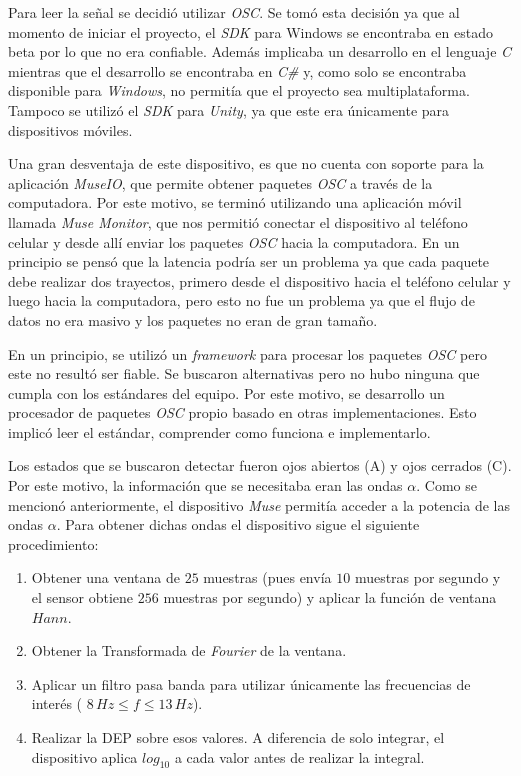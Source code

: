Para leer la señal se decidió utilizar \emph{OSC}. Se tomó esta decisión ya que al momento de iniciar el proyecto, el \emph{SDK} para Windows se encontraba en estado beta por lo que no era confiable. Además implicaba un desarrollo en el lenguaje \emph{C} mientras que el desarrollo se encontraba en \emph{C\#} y, como solo se encontraba disponible para \emph{Windows}, no permitía que el proyecto sea multiplataforma. Tampoco se utilizó el \emph{SDK} para \emph{Unity}, ya que este era únicamente para dispositivos móviles.

Una gran desventaja de este dispositivo, es que no cuenta con soporte para la aplicación \emph{MuseIO}, que permite obtener paquetes \emph{OSC} a través de la computadora. Por este motivo, se terminó utilizando una aplicación móvil llamada \emph{Muse Monitor}, que nos permitió conectar el dispositivo al teléfono celular y desde allí enviar los paquetes \emph{OSC} hacia la computadora. En un principio se pensó que la latencia podría ser un problema ya que cada paquete debe realizar dos trayectos, primero desde el dispositivo hacia el teléfono celular y luego hacia la computadora, pero esto no fue un problema ya que el flujo de datos no era masivo y los paquetes no eran de gran tamaño.

En un principio, se utilizó un \emph{framework} para procesar los paquetes \emph{OSC} pero este no resultó ser fiable. Se buscaron alternativas pero no hubo ninguna que cumpla con los estándares del equipo. Por este motivo, se desarrollo un procesador de paquetes \emph{OSC} propio basado en otras implementaciones. Esto implicó leer el estándar, comprender como funciona e implementarlo.
 
 Los estados que se buscaron detectar fueron ojos abiertos (A) y ojos cerrados (C). Por este motivo, la información que se necesitaba eran las ondas $\alpha$. Como se mencionó anteriormente, el dispositivo \emph{Muse} permitía acceder a la potencia de las ondas $\alpha$. Para obtener dichas ondas el dispositivo sigue el siguiente procedimiento:
 
 \begin{enumerate}
 \item Obtener una ventana de $25$ muestras (pues envía $10$ muestras por segundo y el sensor obtiene $256$ muestras por segundo) y aplicar la función de ventana $Hann$.
 \item Obtener la Transformada de \emph{Fourier} de la ventana.
 \item Aplicar un filtro pasa banda para utilizar únicamente las frecuencias de interés ( $ 8 \, Hz \leq f \leq 13 \, Hz$).
 \item Realizar la DEP sobre esos valores. A diferencia de solo integrar, el dispositivo aplica $log_{10}$  a cada valor antes de realizar la integral.
 \end{enumerate}

